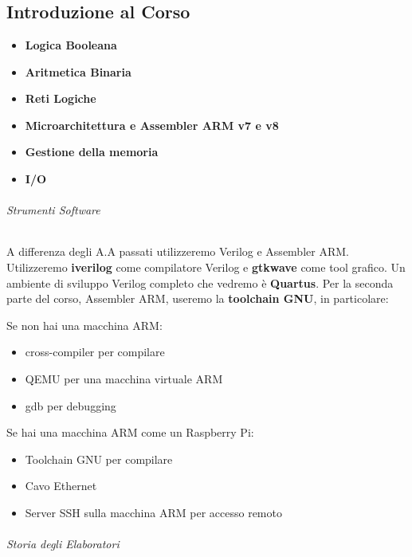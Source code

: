 \part{}
\chapter{Introduzione al Corso}

\begin{itemize}
	\item{\textbf{Logica Booleana}}
	\item{\textbf{Aritmetica Binaria}}
	\item{\textbf{Reti Logiche}}
	\item{\textbf{Microarchitettura e Assembler ARM v7 e v8}}
	\item{\textbf{Gestione della memoria}}
	\item{\textbf{I/O}}
\end{itemize}

\paragraph{Strumenti Software}
A differenza degli A.A passati utilizzeremo Verilog e Assembler ARM.
Utilizzeremo \textbf{iverilog} come compilatore Verilog e \textbf{gtkwave} come tool grafico. Un ambiente di sviluppo Verilog completo che vedremo è \textbf{Quartus}.
Per la seconda parte del corso, Assembler ARM, useremo la \textbf{toolchain GNU}, in particolare:


\subparagraph{Se non hai una macchina ARM:}
\begin{itemize}
	\item{cross-compiler per compilare}
	\item{QEMU per una macchina virtuale ARM}
	\item{gdb per debugging}
\end{itemize}

\subparagraph{Se hai una macchina ARM come un Raspberry Pi:}
\begin{itemize}
	\item{Toolchain GNU per compilare}
	\item{Cavo Ethernet}
	\item{Server SSH sulla macchina ARM per accesso remoto}
\end{itemize}

\paragraph{Storia degli Elaboratori}

